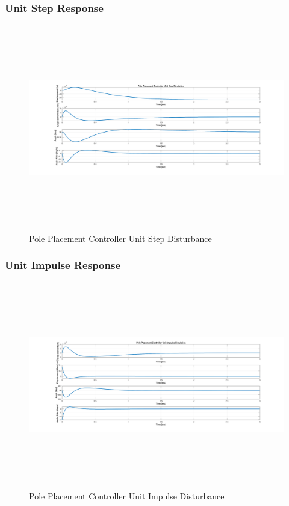 \documentclass[titlepage]{article}
\begin{document}
\subsubsection{Unit Step Response}
\begin{figure}[H]
\center
\includegraphics[width=15cm, height=9cm]{pole_placement_unit_step.png}
\caption{Pole Placement Controller Unit Step Disturbance}
\end{figure}

\subsubsection{Unit Impulse Response}
\begin{figure}[H]
\center
\includegraphics[width=15cm, height=9cm]{pole_placement_unit_impulse.png}
\caption{Pole Placement Controller Unit Impulse Disturbance}
\end{figure}
\end{document}

